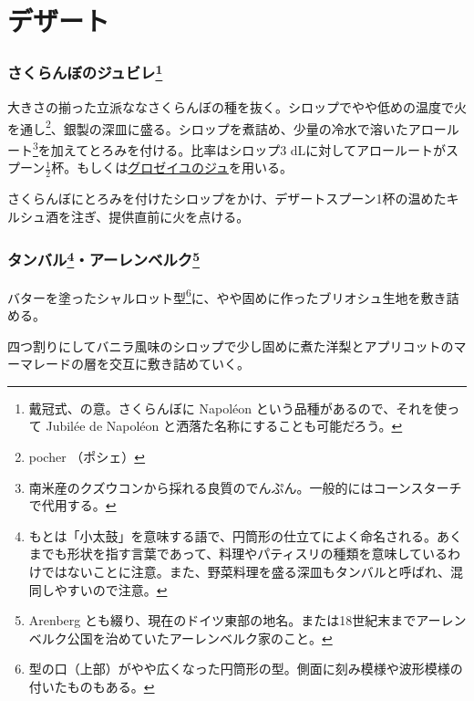 \hypertarget{ux30c7ux30b6ux30fcux30c8}{%
\section{デザート}\label{ux30c7ux30b6ux30fcux30c8}}
\begin{recette}
\hypertarget{cerises-jubilee}{%
\subsubsection[さくらんぼのジュビレ]{\texorpdfstring{さくらんぼのジュビレ\footnote{戴冠式、の意。さくらんぼに
  Napoléon という品種があるので、それを使って Jubilée de Napoléon
  と洒落た名称にすることも可能だろう。}}{さくらんぼのジュビレ}}\label{cerises-jubilee}}


大きさの揃った立派ななさくらんぼの種を抜く。シロップでやや低めの温度で火を通し\footnote{pocher
  （ポシェ）}、銀製の深皿に盛る。シロップを煮詰め、少量の冷水で溶いたアロールート\footnote{南米産のクズウコンから採れる良質のでんぷん。一般的にはコーンスターチで代用する。}を加えてとろみを付ける。比率はシロップ3
dLに対してアロールートがスプーン\(\frac{1}{2}\)杯。もしくは\protect\hyperlink{gelee-de-groseilles-a}{グロゼイユのジュ}を用いる。

さくらんぼにとろみを付けたシロップをかけ、デザートスプーン1杯の温めたキルシュ酒を注ぎ、提供直前に火を点ける。

\hypertarget{timbale-d-arenberg}{%
\subsubsection[タンバル・アーレンベルク]{\texorpdfstring{タンバル\footnote{もとは「小太鼓」を意味する語で、円筒形の仕立てによく命名される。あくまでも形状を指す言葉であって、料理やパティスリの種類を意味しているわけではないことに注意。また、野菜料理を盛る深皿もタンバルと呼ばれ、混同しやすいので注意。}・アーレンベルク\footnote{Arenberg
  とも綴り、現在のドイツ東部の地名。または18世紀末までアーレンベルク公国を治めていたアーレンベルク家のこと。}}{タンバル・アーレンベルク}}\label{timbale-d-arenberg}}


バターを塗ったシャルロット型\footnote{型の口（上部）がやや広くなった円筒形の型。側面に刻み模様や波形模様の付いたものもある。}に、やや固めに作ったブリオシュ生地を敷き詰める。

四つ割りにしてバニラ風味のシロップで少し固めに煮た洋梨とアプリコットのマーマレードの層を交互に敷き詰めていく。


\end{recette}
